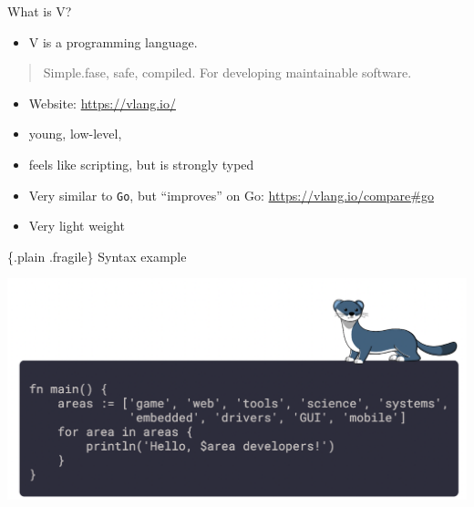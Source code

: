 \documentclass[
  ignorenonframetext,
]{beamer}
\providecommand{\tightlist}{%
  \setlength{\itemsep}{0pt}\setlength{\parskip}{0pt}}
\begin{document}
\begin{frame}[fragile]{What is V?}
\protect\hypertarget{what-is-v}{}
\begin{itemize}
\tightlist
\item
  V is a programming language.
\end{itemize}

\begin{quote}
Simple.fase, safe, compiled. For developing maintainable software.
\end{quote}

\begin{itemize}
\tightlist
\item
  Website: \url{https://vlang.io/}
\item
  young, low-level,
\item
  feels like scripting, but is strongly typed
\item
  Very similar to \texttt{Go}, but ``improves'' on Go:
  \url{https://vlang.io/compare\#go}
\item
  Very light weight
\end{itemize}
\end{frame}

\begin{frame}{\{.plain .fragile\} Syntax example}
\protect\hypertarget{plain-.fragile-syntax-example}{}
\begin{centering}
  \includegraphics[width=0.8\paperwidth]{img/example.v}
  \par
\end{centering}
\end{frame}
\end{document}
